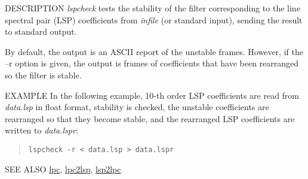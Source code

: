 \begin{synopsis}
\item [lspcheck] [ --m $M$ ] [ --s $S$ ] [ --k ] [ --i $I$ ] [ --o $O$ ]
		[ --r ] [ {\em infile} ] 
\end{synopsis}

\begin{qsection}{DESCRIPTION}
{\em lspcheck} tests the stability of the filter 
corresponding to the line spectral pair (LSP) coefficients 
from {\em infile} (or standard input), 
sending the result to standard output.

By default, the output is an ASCII report of the unstable frames.
However, if the --r option is given, 
the output is frames of coefficients 
that have been rearranged so the filter is stable.
\end{qsection}

\begin{options}
\end{options}

\begin{qsection}{EXAMPLE}
In the following example, 10-th order LSP coefficients are
read from {\em data.lsp} in float format,
stability is checked, the unstable coefficients are rearranged
so that they become stable, and the rearranged LSP coefficients
are written to {\em data.lspr}:
\begin{quote}
\verb!lspcheck -r < data.lsp > data.lspr!
\end{quote}
\end{qsection}

\begin{qsection}{SEE ALSO}
\hyperlink{lpc}{lpc},
\hyperlink{lpc2lsp}{lpc2lsp},
\hyperlink{lsp2lpc}{lsp2lpc}
\end{qsection}
